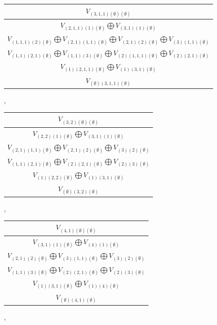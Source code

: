 \documentclass[letterpaper,11pt]{article}
\begin{document}
	\newline 
	\begin{tabular}{| c |}
		\hline
		$V_{(3,1,1)(\emptyset)(\emptyset)}$\\
		\hline
		$V_{(2,1,1)(1)(\emptyset)}$$\bigoplus$$V_{(3,1)(1)(\emptyset)}$\\
		\hline
		$V_{(1,1,1)(2)(\emptyset)}$$\bigoplus$$V_{(2,1)(1,1)(\emptyset)}$$\bigoplus$$V_{(2,1)(2)(\emptyset)}$$\bigoplus$$V_{(3)(1,1)(\emptyset)}$\\
		\hline
		$V_{(1,1)(2,1)(\emptyset)}$$\bigoplus$$V_{(1,1)(3)(\emptyset)}$$\bigoplus$$V_{(2)(1,1,1)(\emptyset)}$$\bigoplus$$V_{(2)(2,1)(\emptyset)}$\\
		\hline
		$V_{(1)(2,1,1)(\emptyset)}$$\bigoplus$$V_{(1)(3,1)(\emptyset)}$\\
		\hline
		$V_{(\emptyset)(3,1,1)(\emptyset)}$\\
		\hline
	\end{tabular}, 
	\begin{tabular}{| c |}
		\hline
		$V_{(3,2)(\emptyset)(\emptyset)}$\\
		\hline
		$V_{(2,2)(1)(\emptyset)}$$\bigoplus$$V_{(3,1)(1)(\emptyset)}$\\
		\hline
		$V_{(2,1)(1,1)(\emptyset)}$$\bigoplus$$V_{(2,1)(2)(\emptyset)}$$\bigoplus$$V_{(3)(2)(\emptyset)}$\\
		\hline
		$V_{(1,1)(2,1)(\emptyset)}$$\bigoplus$$V_{(2)(2,1)(\emptyset)}$$\bigoplus$$V_{(2)(3)(\emptyset)}$\\
		\hline
		$V_{(1)(2,2)(\emptyset)}$$\bigoplus$$V_{(1)(3,1)(\emptyset)}$\\
		\hline
		$V_{(\emptyset)(3,2)(\emptyset)}$\\
		\hline
	\end{tabular}, 
	\newline 
	\begin{tabular}{| c |}
		\hline
		$V_{(4,1)(\emptyset)(\emptyset)}$\\
		\hline
		$V_{(3,1)(1)(\emptyset)}$$\bigoplus$$V_{(4)(1)(\emptyset)}$\\
		\hline
		$V_{(2,1)(2)(\emptyset)}$$\bigoplus$$V_{(3)(1,1)(\emptyset)}$$\bigoplus$$V_{(3)(2)(\emptyset)}$\\
		\hline
		$V_{(1,1)(3)(\emptyset)}$$\bigoplus$$V_{(2)(2,1)(\emptyset)}$$\bigoplus$$V_{(2)(3)(\emptyset)}$\\
		\hline
		$V_{(1)(3,1)(\emptyset)}$$\bigoplus$$V_{(1)(4)(\emptyset)}$\\
		\hline
		$V_{(\emptyset)(4,1)(\emptyset)}$\\
		\hline
	\end{tabular}, 
\end{document}

